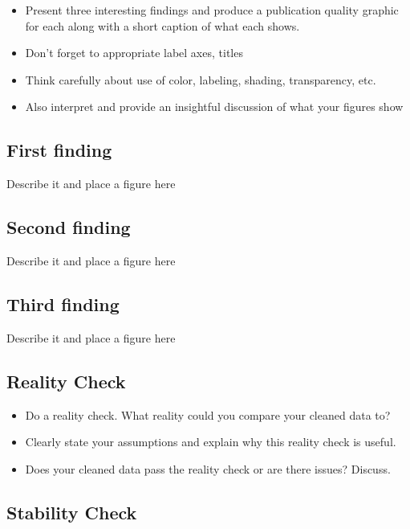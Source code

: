 \documentclass[10pt,letterpaper]{article}
\begin{document}
\begin{itemize}
\item Present three interesting findings and produce a publication quality graphic for each along with a short caption of what each shows.
\item Don't forget to appropriate label axes, titles
\item Think carefully about use of color, labeling, shading, transparency, etc.
\item Also interpret and provide an insightful discussion of what your figures show
\end{itemize}

\subsection{First finding}\label{first-finding}

Describe it and place a figure here

\subsection{Second finding}\label{second-finding}

Describe it and place a figure here

\subsection{Third finding}\label{third-finding}

Describe it and place a figure here

\subsection{Reality Check}\label{reality-check}

\begin{itemize}
\item Do a reality check. What reality could you compare your cleaned data to?
\item Clearly state your assumptions and explain why this reality check is useful.
\item Does your cleaned data pass the reality check or are there issues? Discuss.
\end{itemize}

\subsection{Stability Check}\label{stability-check}
\end{document}
